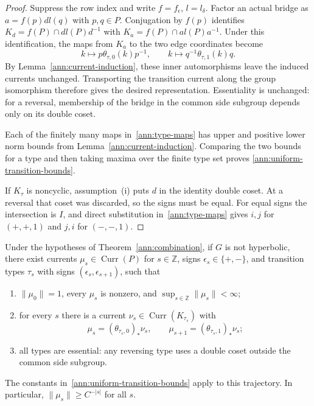 \begin{proof}
Suppress the row index and write $f=f_\epsilon$, $l=l_\delta$.
Factor an actual bridge as $a=f(p)d l(q)$ with $p,q\in P$.
Conjugation by $f(p)$ identifies
$K_d=f(P)\cap d l(P)d^{-1}$ with
$K_a=f(P)\cap a l(P)a^{-1}$.  Under this identification, the maps
from $K_a$ to the two edge coordinates become
\[
 k\longmapsto p\theta_{\tau,0}(k)p^{-1},
 \qquad
 k\longmapsto q^{-1}\theta_{\tau,1}(k)q.
\]
By Lemma~\ref{ann:current-induction}, these inner automorphisms leave
the induced currents unchanged.  Transporting the
transition current along the group isomorphism therefore gives the
desired representation.  Essentiality is unchanged: for a reversal,
membership of the bridge in the common side subgroup depends only
on its double coset.

Each of the finitely many maps in~\eqref{ann:type-maps} has upper
and positive lower norm bounds from
Lemma~\ref{ann:current-induction}.  Comparing the two bounds for a
type and then taking maxima over the finite type set proves
\eqref{ann:uniform-transition-bounds}.

If $K_\tau$ is noncyclic, assumption~\textup{(i)} puts $d$ in the
identity double coset.  At a reversal that coset was discarded, so
the signs must be equal.  For equal signs the intersection is $I$,
and direct substitution in~\eqref{ann:type-maps} gives $i,j$ for
$(+,+,1)$ and $j,i$ for $(-,-,1)$.
\end{proof}

\begin{proposition}
\label{ann:trajectory}
Under the hypotheses of Theorem~\ref{ann:combination}, if $G$ is not
hyperbolic, there exist currents
$\mu_s\in\operatorname{Curr}(P)$ for $s\in\mathbb Z$, signs
$\epsilon_s\in\{+,-\}$, and transition types $\tau_s$ with signs
$(\epsilon_s,\epsilon_{s+1})$, such that
\begin{enumerate}[label=\textup{(\roman*)}]
\item $\|\mu_0\|=1$, every $\mu_s$ is nonzero, and
      $\sup_{s\in\mathbb Z}\|\mu_s\|<\infty$;
\item for every $s$ there is a current
      $\nu_s\in\operatorname{Curr}(K_{\tau_s})$ with
      \[
      \mu_s=(\theta_{\tau_s,0})_*\nu_s,
      \qquad
      \mu_{s+1}=(\theta_{\tau_s,1})_*\nu_s;
      \]
\item all types are essential: any reversing type uses a double
      coset outside the common side subgroup.
\end{enumerate}
The constants in~\eqref{ann:uniform-transition-bounds} apply to this
trajectory.  In particular, $\|\mu_s\|\geq C^{-|s|}$ for all $s$.
\end{proposition}

